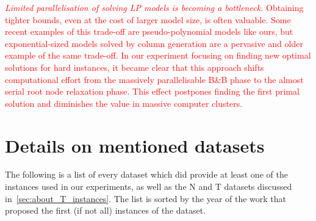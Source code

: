 \documentclass[ppgc,tese,english,formais,babel]{iiufrgs}
\newif\iffinalversion
\newcommand{\oldtext}[1]{\iffinalversion%
\else%
\textcolor{red}{#1}%
\fi%
}
\begin{document}
\oldtext{
\emph{Limited parallelisation of solving LP models is becoming a bottleneck.}
Obtaining tighter bounds, even at the cost of larger model size, is often valuable.
Some recent examples of this trade-off are pseudo-polynomial models like ours, but exponential-sized models solved by column generation are a pervasive and older example of the same trade-off.
In our experiment focusing on finding new optimal solutions for hard instances, it became clear that this approach shifts computational effort from the massively parallelisable B\&B phase to the almost serial root node relaxation phase.
This effect postpones finding the first primal solution and diminishes the value in massive computer clusters.
}





%




\appendix

\chapter{Details on mentioned datasets}
\label{sec:datasets}

The following is a list of every dataset which did provide at least one of the instances used in our experiments, as well as the N and T datasets discussed in~\cref{sec:about_T_instances}.
The list is sorted by the year of the work that proposed the first (if not all) instances of the dataset.

\end{document}

